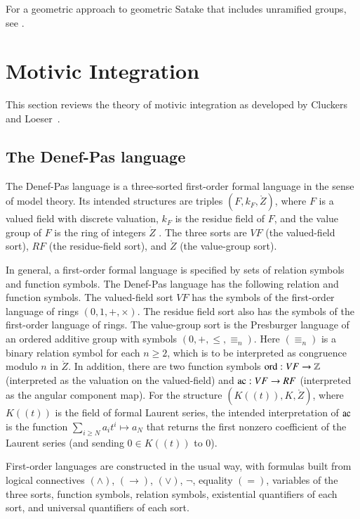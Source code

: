 For a geometric approach to geometric Satake that includes unramified groups, see \cite{zhu2011geometric}.



\section{Motivic Integration}

This section reviews the theory of motivic integration as developed by Cluckers and
Loeser~\cite{cluckers2008constructible}.  

\subsection{The Denef-Pas language}

The Denef-Pas language is a three-sorted first-order formal language in the sense of model theory.  
Its intended structures are triples $(F,k_F,\ring{Z})$, 
where $F$ is a valued field with discrete valuation, 
$k_F$ is the residue field of $F$, 
and the value group of $F$ is the ring of integers $\ring{Z}$ . 
The three sorts are $VF$ (the valued-field sort), $RF$ (the residue-field sort), and $\ring{Z}$ (the value-group sort).

In general, a first-order formal language is specified by sets of relation symbols and function symbols.
The Denef-Pas language has the following relation and function symbols.  
The valued-field sort $VF$ has the symbols of the first-order language of rings $(0,1,+,\times)$.  
The residue field sort also has the symbols of the first-order language of rings.  
The value-group sort is the Presburger language of an ordered additive group with symbols $(0,+,\le,\equiv_n)$.  
Here $(\equiv_n)$ is a binary relation symbol for each $n\ge 2$, which is to be interpreted as congruence modulo $n$ in $\ring{Z}$.
In addition, there are two function symbols ${\operatorname{ord}}:VF\to\mathbb{Z}$ (interpreted as the valuation on the valued-field) and ${\operatorname{ac}}:VF\to RF$ 
(interpreted as the angular component map).  
For the structure $(K((t)),K,\ring{Z})$, where $K((t))$ is the field of formal Laurent series, 
the intended interpretation of ${\operatorname{ac}}$ 
is the function $\sum_{i\ge N} a_i t^i\mapsto a_N$ 
that returns the first nonzero coefficient of the Laurent series (and sending $0\in K((t))$ to $0$).

First-order languages are constructed in the usual way, with formulas built from logical connectives $(\land)$, $(\to)$, $(\lor)$, $\neg$, equality
$(=)$, variables of the three sorts, function symbols, relation symbols, existential quantifiers of each sort, and universal quantifiers of each sort.


